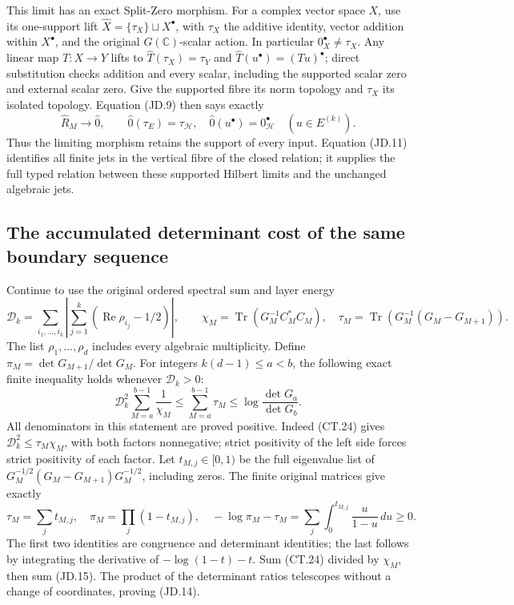 This limit has an exact Split-Zero morphism.  For a complex vector
space \(X\), use its one-support lift
\(\widehat X=\{\tau_X\}\sqcup X^\bullet\), with
\(\tau_X\) the additive identity, vector addition within
\(X^\bullet\), and the original \(G(\mathbb C)\)-scalar
action.  In particular \(0_X^\bullet\ne\tau_X\).
Any linear map \(T:X\to Y\) lifts to
\(\widehat T(\tau_X)=\tau_Y\) and
\(\widehat T(u^\bullet)=(Tu)^\bullet\); direct substitution
checks addition and every scalar, including the supported scalar
zero and external scalar zero.  Give the supported fibre its norm
topology and \(\tau_X\) its isolated topology.  Equation (JD.9)
then says exactly
\[
 \widehat R_M\longrightarrow\widehat 0,
 \qquad \widehat0(\tau_E)=\tau_{\mathcal H},\quad
 \widehat0(u^\bullet)=0_{\mathcal H}^\bullet
                    \quad(u\in E^{(k)}).
 \tag{JD.12}
\]
Thus the limiting morphism retains the support of every input.
Equation (JD.11) identifies all finite jets in the vertical fibre
of the closed relation; it supplies the full typed relation between
these supported Hilbert limits and the unchanged algebraic jets.

\subsection{The accumulated determinant cost of the same boundary sequence}

Continue to use the original ordered spectral sum and layer energy
\[
 \mathcal D_k=\sum_{i_1,\ldots,i_k}
     \left|\sum_{j=1}^k(\operatorname{Re}\rho_{i_j}-1/2)\right|,
 \qquad \chi_M=\operatorname{Tr}(G_M^{-1}C_M^*C_M),
 \quad \tau_M=\operatorname{Tr}(G_M^{-1}(G_M-G_{M+1})).
 \tag{JD.13}
\]
The list \(\rho_1,\ldots,\rho_d\) includes every algebraic
multiplicity.  Define \(\pi_M=\det G_{M+1}/\det G_M\).
For integers \(k(d-1)\le a<b\), the following exact finite
inequality holds whenever \(\mathcal D_k>0\):
\[
 \boxed{
 \mathcal D_k^2\sum_{M=a}^{b-1}\frac1{\chi_M}
 \le \sum_{M=a}^{b-1}\tau_M
 \le \log\frac{\det G_a}{\det G_b}.}
 \tag{JD.14}
\]
All denominators in this statement are proved positive.  Indeed
(CT.24) gives \(\mathcal D_k^2\le\tau_M\chi_M\), with
both factors nonnegative; strict positivity of the left side
forces strict positivity of each factor.  Let
\(t_{M,j}\in[0,1)\) be the full eigenvalue list of
\(G_M^{-1/2}(G_M-G_{M+1})G_M^{-1/2}\), including zeros.
The finite original matrices give exactly
\[
 \tau_M=\sum_jt_{M,j},\quad
 \pi_M=\prod_j(1-t_{M,j}),\quad
 -\log\pi_M-\tau_M
   =\sum_j\int_0^{t_{M,j}}\frac{u}{1-u}\,du\ge0.
 \tag{JD.15}
\]
The first two identities are congruence and determinant identities;
the last follows by integrating the derivative of
\(-\log(1-t)-t\).  Sum (CT.24) divided by \(\chi_M\),
then sum (JD.15).  The product of the determinant ratios telescopes
without a change of coordinates, proving (JD.14).

